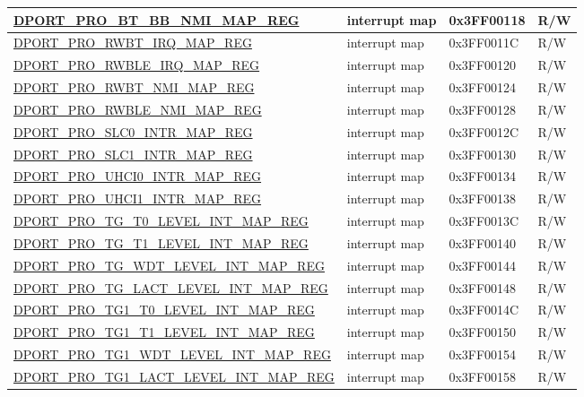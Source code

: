 \begin{longtable}{ |L{8.2cm} | L{4.5cm} | l | l | }
\hyperref[regdesc:PROBTBBNMIMAPREG]{DPORT\_PRO\_BT\_BB\_NMI\_MAP\_REG} & interrupt map & 0x3FF00118 & R/W \\ \hline
\hyperref[regdesc:PRORWBTIRQMAPREG]{DPORT\_PRO\_RWBT\_IRQ\_MAP\_REG} & interrupt map & 0x3FF0011C & R/W \\ \hline
\hyperref[regdesc:PRORWBLEIRQMAPREG]{DPORT\_PRO\_RWBLE\_IRQ\_MAP\_REG} & interrupt map & 0x3FF00120 & R/W \\ \hline
\hyperref[regdesc:PRORWBTNMIMAPREG]{DPORT\_PRO\_RWBT\_NMI\_MAP\_REG} & interrupt map & 0x3FF00124 & R/W \\ \hline
\hyperref[regdesc:PRORWBLENMIMAPREG]{DPORT\_PRO\_RWBLE\_NMI\_MAP\_REG} & interrupt map & 0x3FF00128 & R/W \\ \hline
\hyperref[regdesc:PROSLC0INTRMAPREG]{DPORT\_PRO\_SLC0\_INTR\_MAP\_REG} & interrupt map & 0x3FF0012C & R/W \\ \hline
\hyperref[regdesc:PROSLC1INTRMAPREG]{DPORT\_PRO\_SLC1\_INTR\_MAP\_REG} & interrupt map & 0x3FF00130 & R/W \\ \hline
\hyperref[regdesc:PROUHCI0INTRMAPREG]{DPORT\_PRO\_UHCI0\_INTR\_MAP\_REG} & interrupt map & 0x3FF00134 & R/W \\ \hline
\hyperref[regdesc:PROUHCI1INTRMAPREG]{DPORT\_PRO\_UHCI1\_INTR\_MAP\_REG} & interrupt map & 0x3FF00138 & R/W \\ \hline
\hyperref[regdesc:PROTGT0LEVELINTMAPREG]{DPORT\_PRO\_TG\_T0\_LEVEL\_INT\_MAP\_REG} & interrupt map & 0x3FF0013C & R/W \\ \hline
\hyperref[regdesc:PROTGT1LEVELINTMAPREG]{DPORT\_PRO\_TG\_T1\_LEVEL\_INT\_MAP\_REG} & interrupt map & 0x3FF00140 & R/W \\ \hline
\hyperref[regdesc:PROTGWDTLEVELINTMAPREG]{DPORT\_PRO\_TG\_WDT\_LEVEL\_INT\_MAP\_REG} & interrupt map & 0x3FF00144 & R/W \\ \hline
\hyperref[regdesc:PROTGLACTLEVELINTMAPREG]{DPORT\_PRO\_TG\_LACT\_LEVEL\_INT\_MAP\_REG} & interrupt map & 0x3FF00148 & R/W \\ \hline
\hyperref[regdesc:PROTG1T0LEVELINTMAPREG]{DPORT\_PRO\_TG1\_T0\_LEVEL\_INT\_MAP\_REG} & interrupt map & 0x3FF0014C & R/W \\ \hline
\hyperref[regdesc:PROTG1T1LEVELINTMAPREG]{DPORT\_PRO\_TG1\_T1\_LEVEL\_INT\_MAP\_REG} & interrupt map & 0x3FF00150 & R/W \\ \hline
\hyperref[regdesc:PROTG1WDTLEVELINTMAPREG]{DPORT\_PRO\_TG1\_WDT\_LEVEL\_INT\_MAP\_REG} & interrupt map & 0x3FF00154 & R/W \\ \hline
\hyperref[regdesc:PROTG1LACTLEVELINTMAPREG]{DPORT\_PRO\_TG1\_LACT\_LEVEL\_INT\_MAP\_REG} & interrupt map & 0x3FF00158 & R/W \\ \hline

\end{longtable}
